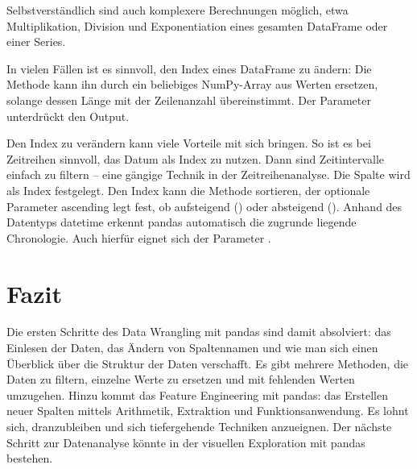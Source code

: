 Selbstverständlich sind auch komplexere Berechnungen möglich, etwa Multiplikation, Division und Exponentiation eines gesamten DataFrame oder einer Series.

In vielen Fällen ist es sinnvoll, den Index eines DataFrame zu ändern: Die Methode  kann ihn durch ein beliebiges NumPy-Array aus Werten ersetzen, solange dessen Länge mit der Zeilenanzahl übereinstimmt. Der Parameter  unterdrückt den Output.

Den Index zu verändern kann viele Vorteile mit sich bringen. So ist es bei Zeitreihen sinnvoll, das Datum als Index zu nutzen. Dann sind Zeitintervalle einfach zu filtern -- eine gängige Technik in der Zeitreihenanalyse. Die Spalte  wird als Index festgelegt. Den Index kann die Methode  sortieren, der optionale Parameter ascending legt fest, ob aufsteigend () oder absteigend (). Anhand des Datentyps datetime erkennt pandas automatisch die zugrunde liegende Chronologie. Auch hierfür eignet sich der Parameter .

\section{Fazit}

Die ersten Schritte des Data Wrangling mit pandas sind damit absolviert: das Einlesen der Daten, das Ändern von Spaltennamen und wie man sich einen Überblick über die Struktur der Daten verschafft. Es gibt mehrere Methoden, die Daten zu filtern, einzelne Werte zu ersetzen und mit fehlenden Werten umzugehen. Hinzu kommt das Feature Engineering mit pandas: das Erstellen neuer Spalten mittels Arithmetik, Extraktion und Funktionsanwendung. Es lohnt sich, dranzubleiben und sich tiefergehende Techniken anzueignen. Der nächste Schritt zur Datenanalyse könnte in der visuellen Exploration mit pandas bestehen.